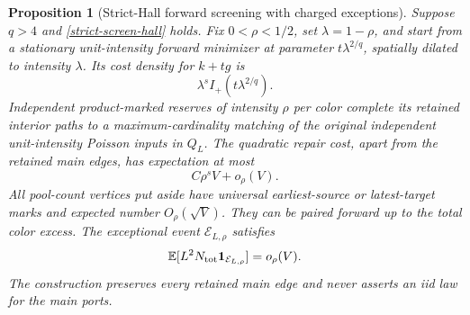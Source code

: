 \documentclass[11pt,reqno]{amsart}
\newtheorem{proposition}[theorem]{Proposition}
\theoremstyle{definition}
\theoremstyle{remark}
\numberwithin{equation}{section}
\newcommand{\E}{\mathbb E}
\begin{document}
\begin{proposition}[Strict-Hall forward screening with charged exceptions]
\label{strict-screen-three-pools}
Suppose \(q>4\) and \eqref{strict-screen-hall} holds. Fix
\(0<\rho<1/2\), set \(\lambda=1-\rho\), and start from a stationary
unit-intensity forward minimizer at parameter \(t\lambda^{2/q}\),
spatially dilated to intensity \(\lambda\). Its cost density for
\(k+tg\) is
\begin{equation}
\label{strict-screen-main-density}
 \lambda^s I_+(t\lambda^{2/q}).
\end{equation}
Independent product-marked reserves of intensity \(\rho\) per color
complete its retained interior paths to a maximum-cardinality matching
of the original independent unit-intensity Poisson inputs in \(Q_L\).
The quadratic repair cost, apart from the retained main edges, has
expectation at most
\begin{equation}
\label{strict-screen-repair-energy}
 C\rho^sV+o_\rho(V).
\end{equation}
All pool-count vertices put aside have universal earliest-source or
latest-target marks and expected number \(O_\rho(\sqrt V)\). They can be
paired forward up to the total color excess. The exceptional event
\(\mathcal E_{L,\rho}\) satisfies
\begin{equation}
\label{strict-screen-exceptional-energy}
 \E[L^2N_{\rm tot}\mathbf1_{\mathcal E_{L,\rho}}]=o_\rho(V).
\end{equation}
The construction preserves every retained main edge and never asserts
an iid law for the main ports.
\end{proposition}
\end{document}
